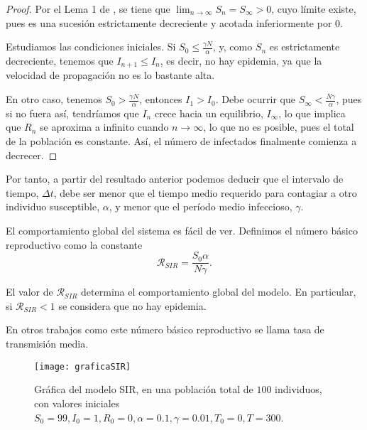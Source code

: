 \begin{proof}

Por el Lema 1 de \cite{allenDiscretetimeSISIR1994}, se tiene que $\lim_{n\rightarrow\infty} S_n = S_\infty > 0$,  cuyo límite existe, pues es una sucesión estrictamente decreciente y acotada inferiormente por $0$. 

Estudiamos las condiciones iniciales. Si $S_0\leq \frac{\gamma N}{\alpha}$, y, como $S_n$ es estrictamente decreciente, tenemos que $I_{n+1}\leq I_n$, es decir, no hay epidemia, ya que la velocidad de propagación no es lo bastante alta.

En otro caso, tenemos $S_0> \frac{\gamma N}{\alpha}$, entonces $I_1>I_0$. Debe ocurrir que $S_\infty <\frac{N\gamma}{\alpha}$, pues si no fuera así, tendríamos que $I_n$ crece hacia un equilibrio, $I_\infty$, lo que implica que $R_n$ se aproxima a infinito cuando $n\rightarrow\infty$, lo que no es posible, pues el total de la población es constante. Así, el número de infectados finalmente comienza a decrecer.
\end{proof}

Por tanto, a partir del resultado anterior podemos deducir que el intervalo de tiempo, $\Delta t$, debe ser menor que el tiempo medio requerido para contagiar a otro individuo susceptible, $\alpha$, y menor que el período medio infeccioso, $\gamma$.


El comportamiento global del sistema es fácil de ver. Definimos el número básico reproductivo como la constante 
$$\mathcal{R}_{SIR}=\frac{S_0 \alpha}{N\gamma }.$$

El valor de $\mathcal{R}_{SIR}$ determina el comportamiento global del modelo. En particular, si $\mathcal{R}_{SIR}<1$ se considera que no hay epidemia.

En otros trabajos como \cite{demongeotSIEpidemicModel} este número básico reproductivo se llama tasa de transmisión media.



\begin{figure}
\begin{center}
\caption{Gráfica del modelo SIR, en una población total de $100$ individuos, con valores iniciales $S_0=99, I_0 = 1, R_0 = 0, \alpha = 0.1, \gamma = 0.01, T_0 = 0, T = 300$.}
\texttt{[image: graficaSIR]}
\end{center}
\end{figure}

